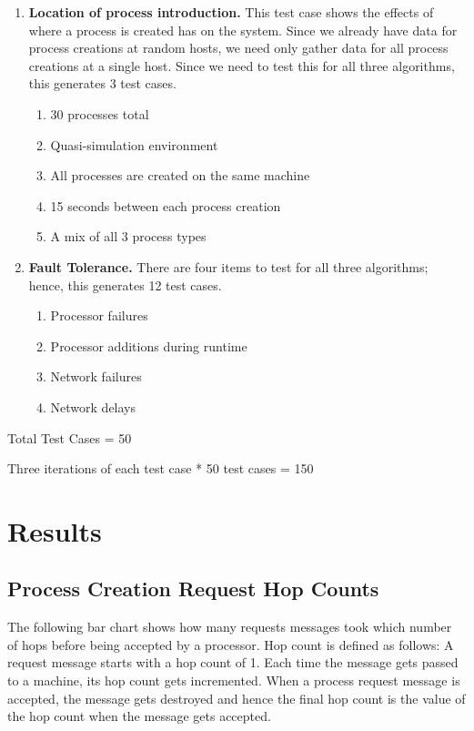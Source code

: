 \documentclass{report}
\begin{document}
\begin{enumerate}
\item \textbf{Location of process introduction.} 
This test case shows the effects of where a process is created has on the
system.  Since we already have data for process creations at random hosts,
we need only gather data for all process creations at a single host.  Since
we need to test this for all three algorithms, this generates 3 test cases.

  \begin{enumerate}
	\item 30 processes total
	\item Quasi-simulation environment
	\item All processes are created on the same machine
	\item 15 seconds between each process creation
	\item A mix of all 3 process types
  \end{enumerate}


\item \textbf{Fault Tolerance.}  
There are four items to test for all three algorithms; hence, this generates
12 test cases.

  \begin{enumerate}
	\item Processor failures
	\item Processor additions during runtime
	\item Network failures
	\item Network delays
  \end{enumerate}


\end{enumerate}

Total Test Cases = 50

Three iterations of each test case * 50 test cases = 150


\section{Results}

\subsection{Process Creation Request Hop Counts}

The following bar chart shows how many requests messages took which number
of hops before being accepted by a processor.  Hop count is defined as
follows:  A request message starts with a hop count of 1.  Each time the
message gets passed to a machine, its hop count gets incremented.  When a
process request message is accepted, the message gets destroyed and hence
the final hop count is the value of the hop count when the message gets
accepted.
\end{document}
